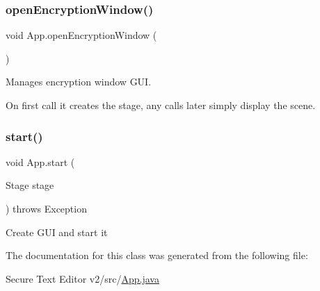 \mbox{\label{class_app_ac05e2e5c6881f45164dba0662e9741ee}} 
\subsubsection{\texorpdfstring{open\+Encryption\+Window()}{openEncryptionWindow()}}
{\footnotesize\ttfamily void App.\+open\+Encryption\+Window (\begin{DoxyParamCaption}{ }\end{DoxyParamCaption})}

Manages encryption window G\+UI.

On first call it creates the stage, any calls later simply display the scene. \mbox{\label{class_app_a1e9bed8a34c642bf9796dc6ba51ad2b6}} 
\subsubsection{\texorpdfstring{start()}{start()}}
{\footnotesize\ttfamily void App.\+start (\begin{DoxyParamCaption}\item[{Stage}]{stage }\end{DoxyParamCaption}) throws Exception}

Create G\+UI and start it 

The documentation for this class was generated from the following file\+:\begin{DoxyCompactItemize}
\item 
Secure Text Editor v2/src/\mbox{\hyperlink{_app_8java}{App.\+java}}\end{DoxyCompactItemize}
